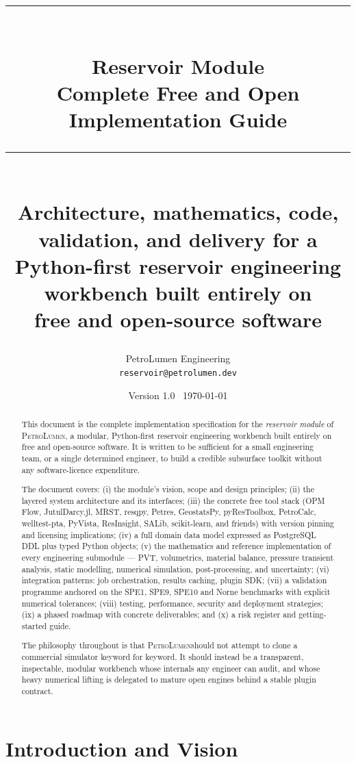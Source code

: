 \documentclass[11pt,a4paper]{article}
\title{
  \vspace{-1.5cm}
  \textbf{\petro}\\[0.2em]
  \rule{\linewidth}{1pt}\\[0.4em]
  \Large Reservoir Module\\[0.2em]
  \large Complete Free and Open Implementation Guide\\[0.4em]
  \rule{\linewidth}{1pt}\\[0.6em]
  \normalsize
  Architecture, mathematics, code, validation, and delivery for a\\
  Python-first reservoir engineering workbench built entirely on\\
  free and open-source software
}
\author{PetroLumen Engineering\\[0.3em]\small\texttt{reservoir@petrolumen.dev}}
\date{Version 1.0 \textperiodcentered\ \today}
\newcommand{\petro}{\textsc{PetroLumen}}
\begin{document}
\maketitle
\thispagestyle{empty}

\vfill
\begin{abstract}
\noindent
This document is the complete implementation specification for the
\emph{reservoir module} of \petro, a modular, Python-first reservoir engineering
workbench built entirely on free and open-source software. It is written to be
sufficient for a small engineering team, or a single determined engineer, to
build a credible subsurface toolkit without any software-licence expenditure.

\medskip\noindent
The document covers: (i) the module's vision, scope and design principles;
(ii) the layered system architecture and its interfaces; (iii) the concrete free
tool stack (OPM Flow, JutulDarcy.jl, MRST, resqpy, Petres, GeostatsPy,
pyResToolbox, PetroCalc, welltest-pta, PyVista, ResInsight, SALib,
scikit-learn, and friends) with version pinning and licensing implications;
(iv) a full domain data model expressed as PostgreSQL DDL plus typed Python
objects; (v) the mathematics and reference implementation of every engineering
submodule --- PVT, volumetrics, material balance, pressure transient analysis,
static modelling, numerical simulation, post-processing, and uncertainty;
(vi) integration patterns: job orchestration, results caching, plugin SDK;
(vii) a validation programme anchored on the SPE1, SPE9, SPE10 and Norne
benchmarks with explicit numerical tolerances; (viii) testing, performance,
security and deployment strategies; (ix) a phased roadmap with concrete
deliverables; and (x) a risk register and getting-started guide.

\medskip\noindent
The philosophy throughout is that \petro should not attempt to clone a
commercial simulator keyword for keyword. It should instead be a transparent,
inspectable, modular workbench whose internals any engineer can audit, and whose
heavy numerical lifting is delegated to mature open engines behind a stable
plugin contract.
\end{abstract}

\vfill
\clearpage

\tableofcontents
\clearpage

\section{Introduction and Vision}
\end{document}
